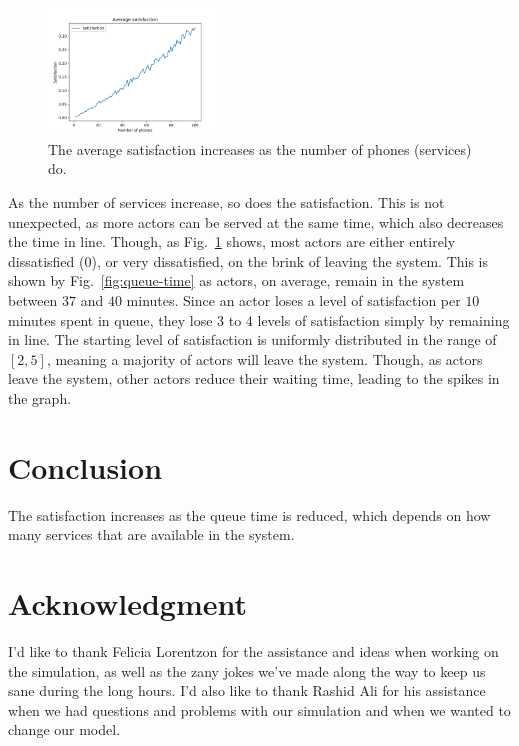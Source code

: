 \documentclass[conference]{IEEEtran}
\begin{document}
\begin{figure}[!b]
    \centerline{
        \includegraphics[width=0.4\textwidth]{figures/satisfaction.png}
    }
    \caption{
        The average satisfaction increases as the number of
        phones (services) do.
    }
    \label{fig:satisfaction}
\end{figure}

As the number of services increase, so does the satisfaction. This
is not unexpected, as more actors can be served at the same time,
which also decreases the time in line. Though, as
Fig.~\ref{fig:satisfaction} shows, most actors are either entirely
dissatisfied ($0$), or very dissatisfied, on the brink of leaving
the system. This is shown by Fig.~\ref{fig:queue-time} as actors,
on average, remain in the system between $37$ and $40$ minutes.
Since an actor loses a level of satisfaction per $10$ minutes spent
in queue, they lose $3$ to $4$ levels of satisfaction simply by
remaining in line. The starting level of satisfaction is uniformly
distributed in the range of $[2, 5]$, meaning a majority of actors
will leave the system. Though, as actors leave the system, other
actors reduce their waiting time, leading to the spikes in the 
graph.

\section{Conclusion}
\label{sec:conclusion}

The satisfaction increases as the queue time is reduced, which
depends on how many services that are available in the system.

\newpage

\section*{Acknowledgment}
\label{sec:acknowledgment}

I'd like to thank Felicia Lorentzon for the assistance and ideas
when working on the simulation, as well as the zany jokes we've
made along the way to keep us sane during the long hours. I'd also
like to thank Rashid Ali for his assistance when we had questions
and problems with our simulation and when we wanted to change our
model.

\printbibliography
\end{document}

